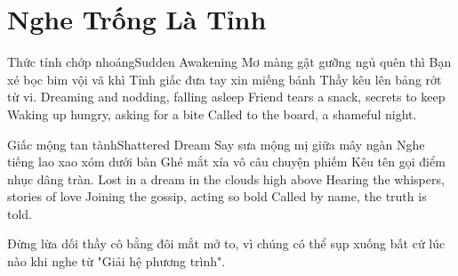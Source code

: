 \chapter{Nghe Trống Là Tỉnh}

\begin{tutuyetbox}{Thức tỉnh chớp nhoáng}{Sudden Awakening}
Mơ màng gật gưỡng ngủ quên thì
Bạn xé bọc bim vội vã khì
Tỉnh giấc đưa tay xin miếng bánh
Thầy kêu lên bảng rớt từ vi.
\tcblower
Dreaming and nodding, falling asleep 
Friend tears a snack, secrets to keep 
Waking up hungry, asking for a bite 
Called to the board, a shameful night.
\end{tutuyetbox}

\begin{tutuyetbox}{Giấc mộng tan tành}{Shattered Dream}
Say sưa mộng mị giữa mây ngàn
Nghe tiếng lao xao xóm dưới bàn
Ghé mắt xía vô câu chuyện phiếm
Kêu tên gọi điểm nhục dâng tràn.
\tcblower
Lost in a dream in the clouds high above 
Hearing the whispers, stories of love 
Joining the gossip, acting so bold 
Called by name, the truth is told.
\end{tutuyetbox}

\begin{ghichu}
Đừng lừa dối thầy cô bằng đôi mắt mở to, vì chúng có thể sụp xuống bất cứ lúc nào khi nghe từ "Giải hệ phương trình".
\end{ghichu}
